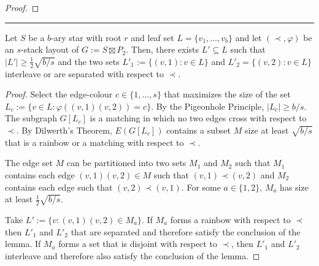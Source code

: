 \documentclass[kpfonts]{patmorin}
\begin{document}
\begin{proof}
\end{proof}  


\hrule

\begin{lem}
  Let $S$ be a $b$-ary star with root $r$ and leaf set $L=\{v_1,\ldots,v_b\}$ and let $(\prec,\varphi)$ be an $s$-stack layout of $G:=S\boxtimes P_2$.  Then, there exists $L'\subseteq L$ such that $|L'|\ge \tfrac{1}{2}\sqrt{b/s}$ and the two sets $L'_1:=\{(v,1):v\in L\}$ and $L'_2=\{(v,2):v\in L\}$ interleave or are separated with respect to $\prec$.  
\end{lem}

\begin{proof}
  Select the edge-colour $c\in\{1,\ldots,s\}$ that maximizes the size of the set $L_c:=\{ v\in L: \varphi((v,1)(v,2))=c\}$.  By the Pigeonhole Principle, $|L_c|\ge b/s$.  The subgraph $G[L_c]$ is a matching in which no two edges cross with respect to $\prec$.  By Dilwerth's Theorem, $E(G[L_c])$ contains a subset $M$ size at least $\sqrt{b/s}$ that is a rainbow or a matching with respect to $\prec$.

  The edge set $M$ can be partitioned into two sets $M_1$ and $M_2$ such that $M_1$ contains each edge $(v,1)(v,2)\in M$ such that $(v,1)\prec (v,2)$ and $M_2$ contains each edge such that $(v,2)\prec (v,1)$.  For some $a\in\{1,2\}$, $M_a$ has size at least $\tfrac{1}{2}\sqrt{b/s}$. 
    
  Take $L':=\{v: (v,1)(v,2)\in M_a\}$.  If $M_a$ forms a rainbow with respect to $\prec$ then $L'_1$ and $L'_2$ that are separated and therefore satisfy the conclusion of the lemma.  If $M_a$ forms a set that is disjoint with respect to $\prec$, then $L'_1$ and $L'_2$ interleave and therefore also satisfy the conclusion of the lemma.
\end{proof}
\end{document}
